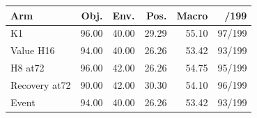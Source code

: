 \begin{tabular}{lrrrrr}
\toprule
Arm & Obj. & Env. & Pos. & Macro & /199 \\
\midrule
K1 & 96.00 & 40.00 & 29.29 & 55.10 & 97/199 \\
Value H16 & 94.00 & 40.00 & 26.26 & 53.42 & 93/199 \\
H8 at72 & 96.00 & 42.00 & 26.26 & 54.75 & 95/199 \\
Recovery at72 & 90.00 & 42.00 & 30.30 & 54.10 & 96/199 \\
Event & 94.00 & 40.00 & 26.26 & 53.42 & 93/199 \\
\bottomrule
\end{tabular}
